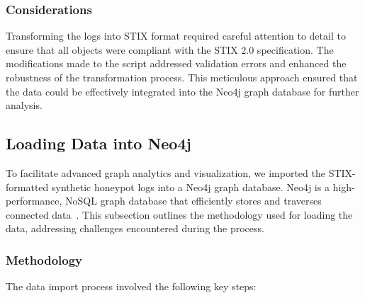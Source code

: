 \documentclass[conference]{IEEEtran}
\begin{document}
\subsubsection{Considerations}

Transforming the logs into STIX format required careful attention to detail to ensure that all objects were compliant with the STIX 2.0 specification. The modifications made to the script addressed validation errors and enhanced the robustness of the transformation process. This meticulous approach ensured that the data could be effectively integrated into the Neo4j graph database for further analysis.


\subsection{Loading Data into Neo4j}

To facilitate advanced graph analytics and visualization, we imported the STIX-formatted synthetic honeypot logs into a Neo4j graph database. Neo4j is a high-performance, NoSQL graph database that efficiently stores and traverses connected data~\cite{webber2012graph}. This subsection outlines the methodology used for loading the data, addressing challenges encountered during the process.

\subsubsection{Methodology}

The data import process involved the following key steps:
\end{document}
